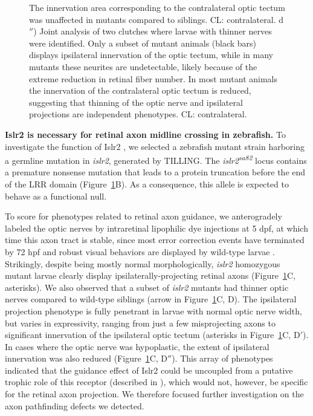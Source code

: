 \begin{figure}[hbtp]
\begin{center}
{		The innervation area corresponding to the contralateral optic tectum was unaffected in mutants compared to siblings.
		CL: contralateral.
		d$''$) Joint analysis of two clutches where larvae with thinner nerves were identified.
		Only a subset of mutant animals (black bars) displays ipsilateral innervation of the optic tectum, while in many mutants these neurites are undetectable, likely because of the extreme reduction in retinal fiber number.
		In most mutant animals the innervation of the contralateral optic tectum is reduced, suggesting that thinning of the optic nerve and ipsilateral projections are independent phenotypes.
		CL: contralateral.
		}
        \label{Linxfig1}
    \end{center}
\end{figure}

\noindent\textbf{Islr2 is necessary for retinal axon midline crossing in zebrafish.}\newline
\indent To investigate the function of Islr2 \invivo{}, we selected a zebrafish mutant strain harboring a germline mutation in \emph{islr2}, generated by TILLING.
The \emph{islr2\textsuperscript{sa82}} locus contains a premature nonsense mutation that leads to a protein truncation before the end of the LRR domain (Figure~\ref{Linxfig1}B).
As a consequence, this allele is expected to behave as a functional null.

To score for phenotypes related to retinal axon guidance, we anterogradely labeled the optic nerves by intraretinal lipophilic dye injections at 5 dpf, at which time this axon tract is stable, since most error correction events have terminated by 72 hpf \cite{hutson2002pathfinding} and robust visual behaviors are displayed by wild-type larvae \cite{easter1996development,neuhauss2003behavioral}.
Strikingly, despite being mostly normal morphologically, \emph{islr2} homozygous mutant larvae clearly display ipsilaterally-projecting retinal axons (Figure~\ref{Linxfig1}C, asterisks).
We also observed that a subset of \emph{islr2} mutants had thinner optic nerves compared to wild-type siblings (arrow in Figure~\ref{Linxfig1}C, D).
The ipsilateral projection phenotype is fully penetrant in larvae with normal optic nerve width, but varies in expressivity, ranging from just a few misprojecting axons to significant innervation of the ipsilateral optic tectum (asterisks in Figure~\ref{Linxfig1}C, D$'$).
In cases where the optic nerve was hypoplastic, the extent of ipsilateral innervation was also reduced (Figure~\ref{Linxfig1}C, D$''$).
This array of phenotypes indicated that the guidance effect of Islr2 could be uncoupled from a putative trophic role of this receptor (described in ), which would not, however, be specific for the retinal axon projection.
We therefore focused further investigation on the axon pathfinding defects we detected.


